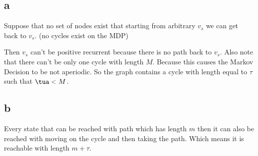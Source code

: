 \subsection{a}
Suppose that no set of nodes exist that starting from arbitrary $v_s$ we can get back to $v_s$. (no cycles exist on the MDP)

\noindent Then $v_s$ can't be positive recurrent because there is no path back to $v_s$. 
Also note that there can't be only one cycle with length $M$. Because this causes the Markov Decision to be not aperiodic. 
So the graph contains a cycle with length equal to $\tau$ such that $\tua < M$.
\subsection{b}
Every state that can be reached with path which has length $m$ then it can also be reached with moving on the cycle and then taking the path. 
Which means it is reachable with length $m + \tau$.
